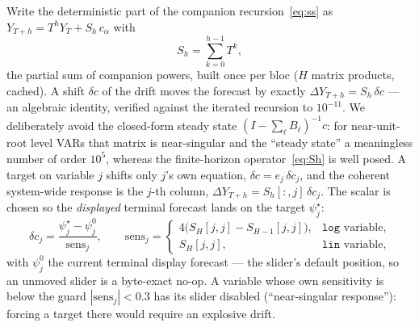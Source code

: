 \documentclass[11pt]{article}
\theoremstyle{plain}
\theoremstyle{remark}
\begin{document}
Write the deterministic part of the companion
recursion~\eqref{eq:ss} as $Y_{T+h} = T^{h} Y_T + S_h\, c_\alpha$ with
\begin{equation}\label{eq:Sh}
  S_h = \sum_{k=0}^{h-1} T^{k},
\end{equation}
the partial sum of companion powers, built once per bloc ($H$
matrix products, cached). A shift $\delta c$ of the drift moves the
forecast by exactly $\Delta Y_{T+h} = S_h\,\delta c$ --- an algebraic
identity, verified against the iterated recursion to $10^{-11}$. We
deliberately avoid the closed-form steady state
$(I - \sum_\ell B_\ell)^{-1} c$: for near-unit-root level VARs that
matrix is near-singular and the ``steady state'' a meaningless number of
order $10^{5}$, whereas the finite-horizon operator~\eqref{eq:Sh} is
well posed. A target on variable $j$ shifts only $j$'s own equation,
$\delta c = e_j\,\delta c_j$, and the coherent system-wide response is
the $j$-th column, $\Delta Y_{T+h} = S_h[:,j]\,\delta c_j$. The scalar
is chosen so the \emph{displayed} terminal forecast lands on the target
$\psi^\star_j$:
\begin{equation}\label{eq:sens}
  \delta c_j = \frac{\psi^\star_j - \psi^{0}_j}{\mathrm{sens}_j},
  \qquad
  \mathrm{sens}_j =
  \begin{cases}
    4\bigl(S_H[j,j] - S_{H-1}[j,j]\bigr), & \texttt{log} \text{ variable},\\[2pt]
    S_H[j,j], & \texttt{lin} \text{ variable},
  \end{cases}
\end{equation}
with $\psi^{0}_j$ the current terminal display forecast --- the
slider's default position, so an unmoved slider is a byte-exact no-op. A
variable whose own sensitivity is below the guard
$|\mathrm{sens}_j| < 0.3$ has its slider disabled (``near-singular
response''): forcing a target there would require an explosive drift.
\end{document}
